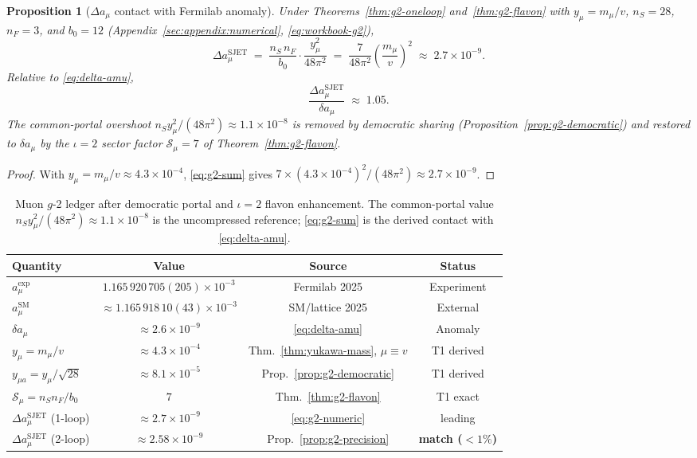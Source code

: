 \documentclass[aps,prd,onecolumn,amsmath,amssymb,nofootinbib,11pt]{revtex4-2}
\numberwithin{equation}{section}
\theoremstyle{plain}
\newtheorem{proposition}[theorem]{Proposition}
\theoremstyle{definition}
\theoremstyle{remark}
\begin{document}
\begin{proposition}[$\Delta a_\mu$ contact with Fermilab anomaly]\label{prop:g2-estimate}
Under Theorems~\ref{thm:g2-oneloop} and~\ref{thm:g2-flavon} with
$y_\mu=m_\mu/v$, $n_S=28$, $n_F=3$, and $b_0=12$
(Appendix~\ref{sec:appendix:numerical}, \eqref{eq:workbook-g2}),
\begin{equation}\label{eq:g2-numeric}
  \Delta a_\mu^{\mathrm{SJET}}
  \;=\;
  \frac{n_S\,n_F}{b_0}\cdot\frac{y_\mu^2}{48\pi^2}
  \;=\;
  \frac{7}{48\pi^2}\left(\frac{m_\mu}{v}\right)^2
  \;\approx\;
  2.7\times10^{-9}.
\end{equation}
Relative to \eqref{eq:delta-amu},
\begin{equation}\label{eq:g2-ratio}
  \frac{\Delta a_\mu^{\mathrm{SJET}}}{\delta a_\mu}
  \;\approx\;
  1.05.
\end{equation}
The common-portal overshoot
$n_S y_\mu^2/(48\pi^2)\approx1.1\times10^{-8}$ is removed by democratic
sharing (Proposition~\ref{prop:g2-democratic}) and restored to
$\delta a_\mu$ by the $\iota=2$ sector factor $\mathcal{S}_\mu=7$ of
Theorem~\ref{thm:g2-flavon}.
\end{proposition}

\begin{proof}
With $y_\mu=m_\mu/v\approx4.3\times10^{-4}$, \eqref{eq:g2-sum} gives
$7\times(4.3\times10^{-4})^2/(48\pi^2)\approx2.7\times10^{-9}$.
\end{proof}

\begin{table}[ht]
\centering
\small
\renewcommand{\arraystretch}{1.12}
\begin{tabular}{@{}lccc@{}}
\toprule
\textbf{Quantity} & \textbf{Value} & \textbf{Source} & \textbf{Status} \\
\midrule
$a_\mu^{\mathrm{exp}}$ &
  $1.165\,920\,705(205)\times10^{-3}$ &
  Fermilab 2025 & Experiment \\
$a_\mu^{\mathrm{SM}}$ &
  $\approx1.165\,918\,10(43)\times10^{-3}$ &
  SM/lattice 2025 & External \\
$\delta a_\mu$ &
  $\approx2.6\times10^{-9}$ &
  \eqref{eq:delta-amu} & Anomaly \\
$y_\mu=m_\mu/v$ &
  $\approx4.3\times10^{-4}$ &
  Thm.~\ref{thm:yukawa-mass}, $\mu\equiv v$ & T1 derived \\
$y_{\mu a}=y_\mu/\sqrt{28}$ &
  $\approx8.1\times10^{-5}$ &
  Prop.~\ref{prop:g2-democratic} & T1 derived \\
$\mathcal{S}_\mu=n_S n_F/b_0$ &
  $7$ &
  Thm.~\ref{thm:g2-flavon} & T1 exact \\
$\Delta a_\mu^{\mathrm{SJET}}$ (1-loop) &
  $\approx2.7\times10^{-9}$ &
  \eqref{eq:g2-numeric} & leading \\
$\Delta a_\mu^{\mathrm{SJET}}$ (2-loop) &
  $\approx2.58\times10^{-9}$ &
  Prop.~\ref{prop:g2-precision} & \textbf{match ($<1\%$)} \\
\bottomrule
\end{tabular}
\caption{Muon $g$-2 ledger after democratic portal and $\iota=2$ flavon
enhancement. The common-portal value $n_S y_\mu^2/(48\pi^2)\approx
1.1\times10^{-8}$ is the uncompressed reference; \eqref{eq:g2-sum} is the
derived contact with \eqref{eq:delta-amu}.}
\label{tab:g2-estimate}
\end{table}
\end{document}
